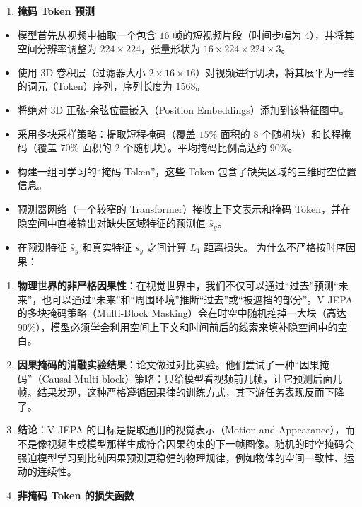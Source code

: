 \begin{enumerate}
\def\labelenumi{\arabic{enumi}.}
\tightlist
\item
  \textbf{掩码 Token 预测}
\end{enumerate}

\begin{itemize}
\item
  模型首先从视频中抽取一个包含 \(16\) 帧的短视频片段（时间步幅为 \(4\)），并将其空间分辨率调整为 \(224\times224\)，张量形状为 \(16\times224\times224\times3\)。
\item
  使用 3D 卷积层（过滤器大小 \(2\times16\times16\)）对视频进行切块，将其展平为一维的词元（Token）序列，序列长度为 \(1568\)。
\item
  将绝对 3D 正弦-余弦位置嵌入（Position Embeddings）添加到该特征图中。
\item
  采用多块采样策略：提取短程掩码（覆盖 \(15\%\) 面积的 \(8\) 个随机块）和长程掩码（覆盖 \(70\%\) 面积的 \(2\) 个随机块）。平均掩码比例高达约 \(90\%\)。
\item
  构建一组可学习的``掩码 Token''，这些 Token 包含了缺失区域的三维时空位置信息。
\item
  预测器网络（一个较窄的 Transformer）接收上下文表示和掩码 Token，并在隐空间中直接输出对缺失区域特征的预测值 \(\hat{s}_y\)。
\item
  在预测特征 \(\hat{s}_y\) 和真实特征 \(s_y\) 之间计算 \(L_1\) 距离损失。
  为什么不严格按时序因果：
\end{itemize}

\begin{enumerate}
\def\labelenumi{\arabic{enumi}.}
\item
  \textbf{物理世界的非严格因果性}：在视觉世界中，我们不仅可以通过``过去''预测``未来''，也可以通过``未来''和``周围环境''推断``过去''或``被遮挡的部分''。V-JEPA 的多块掩码策略（Multi-Block Masking）会在时空中随机挖掉一大块（高达 \(90\%\)），模型必须学会利用空间上下文和时间前后的线索来填补隐空间中的空白。
\item
  \textbf{因果掩码的消融实验结果}：论文做过对比实验。他们尝试了一种``因果掩码''（Causal Multi-block）策略：只给模型看视频前几帧，让它预测后面几帧。结果发现，这种严格遵循因果律的训练方式，其下游任务表现反而下降了。
\item
  \textbf{结论}：V-JEPA 的目标是提取通用的视觉表示（Motion and Appearance），而不是像视频生成模型那样生成符合因果约束的下一帧图像。随机的时空掩码会强迫模型学习到比纯因果预测更稳健的物理规律，例如物体的空间一致性、运动的连续性。
\item
  \textbf{非掩码 Token 的损失函数}
\end{enumerate}

